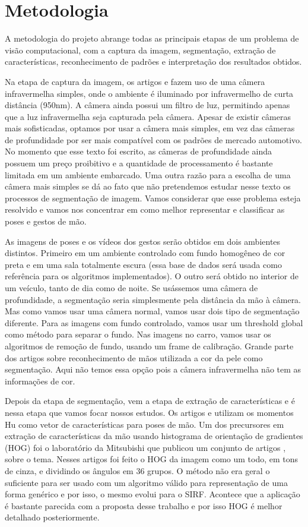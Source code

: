 \section{Metodologia}

A metodologia do projeto abrange todas as principais etapas de um problema de visão computacional, com a captura da imagem, segmentação, extração de características, reconhecimento de padrões e interpretação dos resultados obtidos.

Na etapa de captura da imagem, os artigos \cite{ref2} e \cite{ref1} fazem uso de uma câmera infravermelha simples, onde o ambiente é iluminado por infravermelho de curta distância (950nm). A câmera ainda possui um filtro de luz, permitindo apenas que a luz infravermelha seja capturada pela câmera. Apesar de existir câmeras mais sofisticadas, optamos por usar a câmera mais simples, em vez das câmeras de profundidade por ser mais compatível com os padrões de mercado automotivo. No momento que esse texto foi escrito, as câmeras de profundidade ainda possuem um preço proibitivo e a quantidade de processamento é bastante limitada em um ambiente embarcado. Uma outra razão para a escolha de uma câmera mais simples se dá ao fato que não pretendemos estudar nesse texto os processos de segmentação de imagem. Vamos considerar que esse problema esteja resolvido e vamos nos concentrar em como melhor representar e classificar as poses e gestos de mão.

As imagens de poses e os vídeos dos gestos serão obtidos em  dois ambientes distintos. Primeiro em um ambiente controlado com fundo homogêneo de cor preta e em uma sala totalmente escura (essa base de dados será usada como referência para os algoritmos implementados). O outro será obtido no interior de um veículo, tanto de dia como de noite.
Se usássemos uma câmera de profundidade, a segmentação seria simplesmente pela distância da mão à câmera. Mas como vamos usar uma câmera normal, vamos usar dois tipo de segmentação diferente. 
Para as imagens com fundo controlado, vamos usar um threshold global como método para separar o fundo. Nas imagens no carro, vamos usar os algoritmos de remoção de fundo, usando um frame de calibração.
Grande parte dos artigos sobre reconhecimento de mãos utilizada a cor da pele como segmentação. Aqui não temos essa opção pois a câmera infravermelha não tem as informações de cor.

Depois da etapa de segmentação, vem a etapa de extração de características e é nessa etapa que vamos focar nossos estudos. Os artigos \cite{ref2} e \cite{ref1} utilizam os momentos Hu como vetor de características para poses de mão.
Um dos precursores em extração de características da mão usando histograma de orientação de gradientes (HOG) foi o laboratório da Mitsubishi que publicou um conjunto de artigos \cite{ref3}, \cite{ref4} sobre o tema. Nesses artigos foi feito o HOG da imagem como um todo, em tons de cinza, e dividindo os ângulos em 36 grupos. O método não era geral o suficiente para ser usado com um algoritmo válido para representação de uma forma genérico e por isso, o mesmo evolui para o SIRF. Acontece que a aplicação é bastante parecida com a proposta desse trabalho e por isso HOG é melhor detalhado posteriormente.

